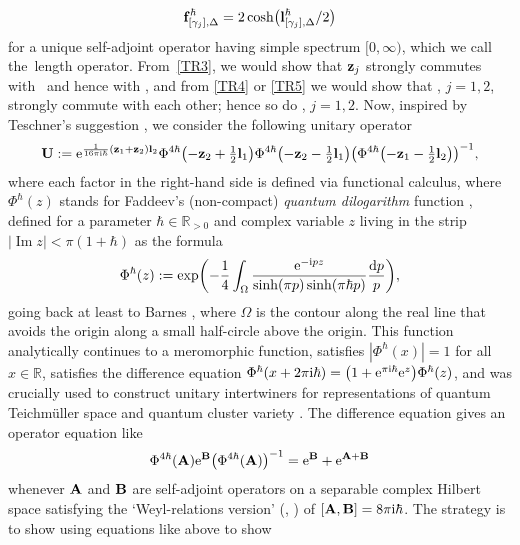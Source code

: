 \documentclass[10pt,a4paper]{amsart}
\numberwithin{equation}{section}
\theoremstyle{definition}
\begin{document}
\[
{\bf f}^\hbar_{[\gamma_j],\Delta} = 2\cosh\bigl({\bf l}^\hbar_{[\gamma_j],\Delta}/2\bigr)
\]
for a unique self-adjoint operator  having simple spectrum $[0,\infty)$, which we call the~length ope\-rator. From~\ref{TR3}, we would show that ${\bf z}_j$ strongly commutes with~ and hence with , and from \ref{TR4} or \ref{TR5} we would show that , $j=1,2$, strongly commute with each other; hence so do , $j=1,2$.
Now, inspired by Teschner's suggestion \cite[equation~(15.11)]{T}, we consider the following unitary operator
\begin{align*}
{\bf U} :=
{\rm e}^{ \frac{1}{16\pi {\rm i} \hbar} ({\bf z}_1 + {\bf z}_2) {\bf l}_2}
\Phi^{4\hbar} \bigl(-{\bf z}_2 + \tfrac{1}{2} {\bf l}_1\bigr)
\Phi^{4\hbar}\bigl(-{\bf z}_2 - \tfrac{1}{2} {\bf l}_1\bigr)
\bigl(\Phi^{4\hbar}\bigl(- {\bf z}_1 - \tfrac{1}{2} {\bf l}_2\bigr)\bigr)^{-1},
\end{align*}
where each factor in the right-hand side is defined via functional calculus, where $\Phi^\hbar(z)$ stands for Faddeev's (non-compact) {\it quantum dilogarithm} function \cite{F95, FK94}, defined for a parameter $\hbar \in \mathbb{R}_{>0}$ and complex variable $z$ living in the strip $|{\operatorname{Im} z}| < \pi(1+\hbar)$ as the formula
\[
\Phi^\hbar(z) := \exp\biggl( - \frac{1}{4} \int_\Omega \frac{{\rm e}^{-{\rm i} pz}}{\sinh(\pi p) \sinh(\pi \hbar p)} \frac{{\rm d}p}{p} \biggr),
\]
going back at least to Barnes \cite{B01}, where $\Omega$ is the contour along the real line that avoids the origin along a small half-circle above the origin. This function analytically continues to a meromorphic function, satisfies $|\Phi^\hbar(x)|=1$ for all $x\in \mathbb{R}$, satisfies the difference equation $\Phi^\hbar(x+2\pi {\rm i} \hbar) = \bigl(1+{\rm e}^{\pi {\rm i} \hbar} {\rm e}^z\bigr) \Phi^\hbar(z)$, and was crucially used to construct unitary intertwiners for representations of quantum Teichm\"uller space \cite{CF, Kash98} and quantum cluster variety \cite{FG09}.
The difference equation gives an operator equation like
\begin{align*}
\Phi^{4\hbar}({\bf A}) {\rm e}^{{\bf B}} \bigl(\Phi^{4 \hbar}({\bf A})\bigr)^{-1} = {\rm e}^{{\bf B}} + {\rm e}^{{\bf A} + {\bf B}}
\end{align*}
whenever ${\bf A}$ and ${\bf B}$ are self-adjoint operators on a separable complex Hilbert space satisfying the `Weyl-relations version' (\cite[Definition~14.2]{Hall}, \cite[Definition~3.5]{Kim_phase}) of $[{\bf A}, {\bf B}] = 8 \pi {\rm i} \hbar$. The strategy is to show using equations like above to show
\end{document}
